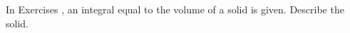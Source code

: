 {\noindent In Exercises} 
{,  an integral equal to the volume of a solid is given. Describe the solid.
}
